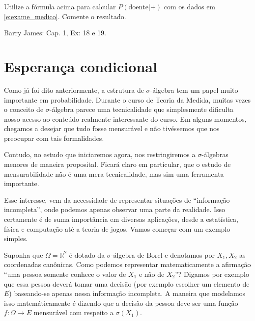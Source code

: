 \begin{exercise}
  Utilize a fórmula acima para calcular $P(\text{doente} | +)$ com os dados em \eqref{e:exame_medico}.
  Comente o resultado.
\end{exercise}

\begin{exercise}
  Barry James: Cap. 1, Ex: 18 e 19.
\end{exercise}



\section{Esperança condicional}

Como já foi dito anteriormente, a estrutura de $\sigma$-álgebra tem um papel muito importante em probabilidade.
Durante o curso de Teoria da Medida, muitas vezes o conceito de $\sigma$-álgebra parece uma tecnicalidade que simplesmente dificulta nosso acesso ao conteúdo realmente interessante do curso.
Em alguns momentos, chegamos a desejar que tudo fosse mensurável e não tivéssemos que nos preocupar com tais formalidades.

Contudo, no estudo que iniciaremos agora, nos restringiremos a $\sigma$-álgebras menores de maneira proposital.
Ficará claro em particular, que o estudo de mensurabilidade não é uma mera tecnicalidade, mas sim uma ferramenta importante.

Esse interesse, vem da necessidade de representar situações de ``informação incompleta'', onde podemos apenas observar uma parte da realidade.
Isso certamente é de suma importância em diversas aplicações, desde a estatística, física e computação até a teoria de jogos.
Vamos começar com um exemplo simples.

Suponha que $\Omega = \mathbb{R}^2$ é dotado da $\sigma$-álgebra de Borel e denotamos por $X_1, X_2$ as coordenadas canônicas.
Como podemos representar matematicamente a afirmação ``uma pessoa somente conhece o valor de $X_1$ e não de $X_2$''?
Digamos por exemplo que essa pessoa deverá tomar uma decisão (por exemplo escolher um elemento de $E$) baseando-se apenas nessa informação incompleta.
A maneira que modelamos isso matemáticamente é dizendo que a decisão da pessoa deve ser uma função $f: \Omega \to E$ mensurável com respeito a $\sigma(X_1)$.

